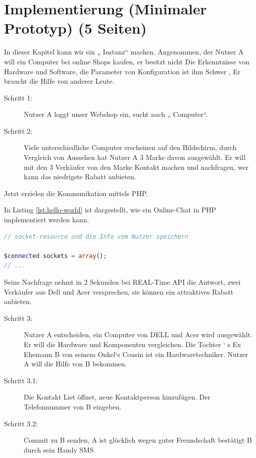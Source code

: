 
\chapter{Implementierung (Minimaler Prototyp) (5 Seiten)}

In dieser Kapitel kann wir ein „ Instanz“ machen. Angenommen, der Nutzer A will ein Computer bei online Shops kaufen, er besitzt nicht Die Erkenntnisse von Hardware und Software, die Parameter von Konfiguration ist ihm Schwer , Er braucht die Hilfe von anderer Leute.

\begin{description}
\item[Schritt 1:] Nutzer A loggt unser Webshop ein, sucht nach „ Computer“.

\item[Schritt 2:] Viele unterschiedliche Computer erscheinen auf den Bildschirm, durch Vergleich von Aussehen hat Nutzer A 3 Marke davon ausgewählt. Er will mit den 3 Verkäufer von den Marke Kontakt machen und nachfragen, wer kann das niedrigste Rabatt anbieten.
\end{description}

Jetzt erzielen die Kommunikation mittels PHP.

In Listing \vref{lst:hello-world} ist dargestellt, wie ein Online-Chat in PHP implementiert werden kann.


\begin{lstlisting}[language=PHP, caption={Online-Chat in PHP}, label=lst:php-chat]
// socket-resource und die Info vom Nutzer speichern

$connected sockets = array();
// ...
\end{lstlisting}

Seine Nachfrage nehmt in 2 Sekunden bei REAL-Time API die Antwort, zwei Verkäufer aus Dell und Acer versprechen, sie können ein attraktives Rabatt anbieten.

\begin{description}
\item[Schritt 3:] Nutzer A entscheiden, ein Computer von DELL und Acer wird ausgewählt. Er will die Hardware und Komponenten vergleichen. Die Tochter ‘ s Ex Ehemann B von seinem Onkel‘s Cousin ist ein Hardwaretechniker. Nutzer A will die Hilfe von B bekommen.

\item[Schritt 3.1:] Die Kontakt List öffnet, neue Kontaktperson hinzufügen. Der Telefonnummer von B eingeben.

\item[Schritt 3.2:] \glqq{}Commit\grqq{} zu B senden, A ist glücklich wegen guter Freundschaft bestätigt B durch sein Handy SMS.
\end{description}

